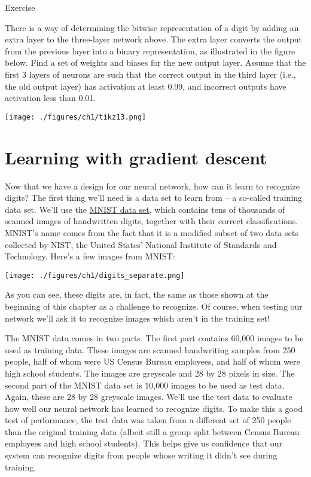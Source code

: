 \documentclass[a4paper,twoside,10pt]{book}
\begin{document}
\begin{exercize}{Exercise}
	\item There is a way of determining the bitwise representation of a digit by adding an extra layer to the three-layer network above. The extra layer converts the output from the previous layer into a binary representation, as illustrated in the figure below. Find a set of weights and biases for the new output layer. Assume that the first 3 layers of neurons are such that the correct output in the third layer (i.e., the old output layer) has activation at least 0.99, and incorrect outputs have activation less than 0.01.
	\begin{center}
		\texttt{[image: ./figures/ch1/tikz13.png]}
	\end{center}
\end{exercize}


\section{Learning with gradient descent}
\label{sec:1.5}
Now that we have a design for our neural network, how can it learn to recognize digits? The first thing we'll need is a data set to learn from -- a so-called training data set. We'll use the \href{http://yann.lecun.com/exdb/mnist/}{MNIST data set}, which contains tens of thousands of scanned images of handwritten digits, together with their correct classifications. MNIST's name comes from the fact that it is a modified subset of two data sets collected by NIST, the United States' National Institute of Standards and Technology. Here's a few images from MNIST:
\begin{center}
	\texttt{[image: ./figures/ch1/digits\_separate.png]}
\end{center}
As you can see, these digits are, in fact, the same as those shown at the beginning of this chapter as a challenge to recognize. Of course, when testing our network we'll ask it to recognize images which aren't in the training set!

The MNIST data comes in two parts. The first part contains 60,000 images to be used as training data. These images are scanned handwriting samples from 250 people, half of whom were US Census Bureau employees, and half of whom were high school students. The images are greyscale and 28 by 28 pixels in size. The second part of the MNIST data set is 10,000 images to be used as test data. Again, these are 28 by 28 greyscale images. We'll use the test data to evaluate how well our neural network has learned to recognize digits. To make this a good test of performance, the test data was taken from a different set of 250 people than the original training data (albeit still a group split between Census Bureau employees and high school students). This helps give us confidence that our system can recognize digits from people whose writing it didn't see during training.
\end{document}
